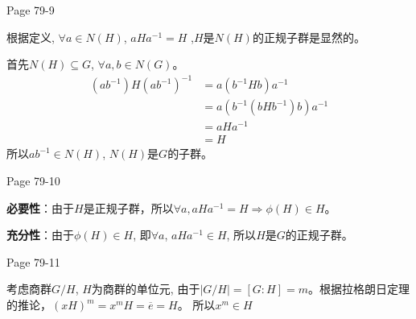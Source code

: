 \documentclass{ximera}
\begin{document}
\begin{problem} Page 79-9
    \begin{solution}
        根据定义, $\forall a \in N(H)$, $aHa^{-1}=H$ ,$H$是$N(H)$的正规子群是显然的。

        首先$N(H) \subseteq G$, $\forall a, b \in N(G)$。
        $$
        \begin{aligned}           
            (ab^{-1})H(ab^{-1})^{-1} &=a(b^{-1}Hb)a^{-1} \\
            &=a(b^{-1}(bHb^{-1})b)a^{-1} \\
            &=aHa^{-1} \\
            &=H
        \end{aligned}
        $$
        所以$ab^{-1} \in N(H)$, $N(H)$是$G$的子群。
    \end{solution}
\end{problem}

\begin{problem} Page 79-10
    \begin{solution}
        \textbf{必要性}：由于$H$是正规子群，所以$\forall a, aHa^{-1}=H \Rightarrow \phi(H) \in H$。

        \textbf{充分性}：由于$\phi(H) \in H$, 即$\forall a$, $aHa^{-1} \in H$, 所以$H$是$G$的正规子群。
    \end{solution}
\end{problem}

\begin{problem} Page 79-11
    \begin{solution}
        考虑商群$G / H$, $H$为商群的单位元, 由于$|G / H| = [G : H] = m$。根据拉格朗日定理的推论，$(xH)^m=x^mH=\overline e = H$。
        所以$x^m \in H$
    \end{solution}
\end{problem}
\end{document}
